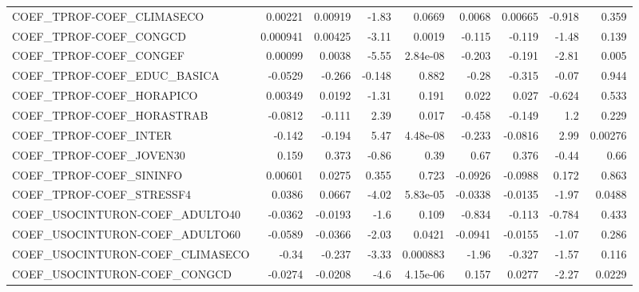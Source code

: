 \begin{tabular}{lrrrrrrrr}
COEF\_TPROF-COEF\_CLIMASECO             &     0.00221 &      0.00919 &   -1.83 &   0.0669 &     0.0068 &     0.00665 &       -0.918 &         0.359 \\
COEF\_TPROF-COEF\_CONGCD                &    0.000941 &      0.00425 &   -3.11 &   0.0019 &     -0.115 &      -0.119 &        -1.48 &         0.139 \\
COEF\_TPROF-COEF\_CONGEF                &     0.00099 &       0.0038 &   -5.55 & 2.84e-08 &     -0.203 &      -0.191 &        -2.81 &         0.005 \\
COEF\_TPROF-COEF\_EDUC\_BASICA           &     -0.0529 &       -0.266 &  -0.148 &    0.882 &      -0.28 &      -0.315 &        -0.07 &         0.944 \\
COEF\_TPROF-COEF\_HORAPICO              &     0.00349 &       0.0192 &   -1.31 &    0.191 &      0.022 &       0.027 &       -0.624 &         0.533 \\
COEF\_TPROF-COEF\_HORASTRAB             &     -0.0812 &       -0.111 &    2.39 &    0.017 &     -0.458 &      -0.149 &          1.2 &         0.229 \\
COEF\_TPROF-COEF\_INTER                 &      -0.142 &       -0.194 &    5.47 & 4.48e-08 &     -0.233 &     -0.0816 &         2.99 &       0.00276 \\
COEF\_TPROF-COEF\_JOVEN30               &       0.159 &        0.373 &   -0.86 &     0.39 &       0.67 &       0.376 &        -0.44 &          0.66 \\
COEF\_TPROF-COEF\_SININFO               &     0.00601 &       0.0275 &   0.355 &    0.723 &    -0.0926 &     -0.0988 &        0.172 &         0.863 \\
COEF\_TPROF-COEF\_STRESSF4              &      0.0386 &       0.0667 &   -4.02 & 5.83e-05 &    -0.0338 &     -0.0135 &        -1.97 &        0.0488 \\
COEF\_USOCINTURON-COEF\_ADULTO40        &     -0.0362 &      -0.0193 &    -1.6 &    0.109 &     -0.834 &      -0.113 &       -0.784 &         0.433 \\
COEF\_USOCINTURON-COEF\_ADULTO60        &     -0.0589 &      -0.0366 &   -2.03 &   0.0421 &    -0.0941 &     -0.0155 &        -1.07 &         0.286 \\
COEF\_USOCINTURON-COEF\_CLIMASECO       &       -0.34 &       -0.237 &   -3.33 & 0.000883 &      -1.96 &      -0.327 &        -1.57 &         0.116 \\
COEF\_USOCINTURON-COEF\_CONGCD          &     -0.0274 &      -0.0208 &    -4.6 & 4.15e-06 &      0.157 &      0.0277 &        -2.27 &        0.0229 \\

\end{tabular}
